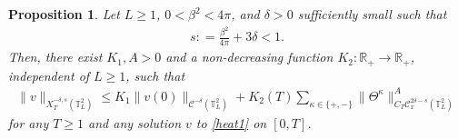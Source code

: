 \documentclass[letterpaper, 11pt,  reqno]{amsart}
\newtheorem{proposition}[theorem]{Proposition}
\theoremstyle{myremark}
\newcommand{\Ta}{\Theta}
\newcommand{\1}{\hspace{0.5mm}\text{I}\hspace{0.5mm}}
\newcommand{\R}{\mathbb{R}}
\newcommand{\T}{\mathbb{T}}
\newcommand{\CC}{\mathcal{C}}
\newcommand{\be}{\beta}
\newcommand{\dl}{\delta}
\newcommand{\kk}{\kappa}
\numberwithin{equation}{section}
\numberwithin{theorem}{section}
\begin{document}
\begin{proposition}\label{PROP:key}
Let $L \ge 1$, $0 < \be^2 < 4\pi$, and  $\dl >0$ sufficiently small such that
\begin{align}
s: = \frac{\be^2}{4\pi} + 3\dl<1.
\label{cond}
\end{align}
Then, 
there exist $K_1, A>0$ 
and a non-decreasing function $K_2: \R_+ \to \R_+$,
independent of $L \ge 1$,  such that
\begin{align}
\|v\|_{X^{-\dl,s}_T(\T^2_L)} \le   K_1 \|v(0)\|_{\CC^{-\dl}(\T^2_L)} + K_2(T)  
\sum_{\kk \in \{+, -\}}
\|\Ta^\kk\|_{C_T \CC^{2\dl-s}_x(\T^2_L)}^{A}
\label{X0}
\end{align}
 for any $T \ge 1$
 and any solution $v$ to \eqref{heat1} on $[0, T]$.
\end{proposition}
\end{document}
